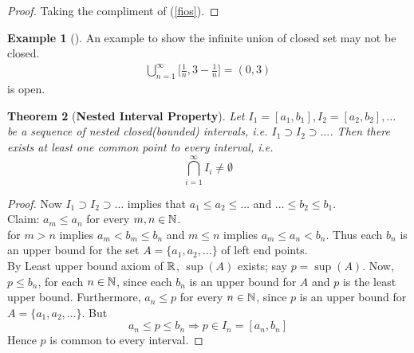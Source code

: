 \documentclass[	DIV=calc,paper=a4,fontsize=11pt]{scrartcl}	 	%
\newtheorem{thm}{Theorem}[section]
\theoremstyle{definition}
\newtheorem{exmp}[thm]{Example}
\theoremstyle{plain}
\theoremstyle{remark}
\begin{document}
\begin{proof}
Taking the compliment of (\ref{fios}).
\end{proof}

\begin{exmp}[]
An example to show the infinite union of closed set may not be closed.
\begin{align}
\bigcup_{n=1}^\infty \biggl[ \frac{1}{n},3-\frac{1}{n}\biggl]=(0,3)
\end{align}
is open.
\end{exmp}

\begin{thm}[\textbf{Nested Interval Property}]\label{nest}
Let $I_1=[a_1,b_1],I_2=[a_2,b_2],\ldots$ be a sequence of nested closed(bounded) intervals, i.e. $I_1\supset I_2\supset\ldots$. Then there exists at least one common point to every interval, i.e.
$$\bigcap_{i=1}^{\infty}I_i\neq \emptyset$$
\end{thm}
\begin{proof}
Now $I_1\supset I_2\supset\ldots$ implies that $a_1\leq a_2\leq \ldots$ and $\ldots \leq b_2\leq b_1$.\\
Claim: $a_m\leq a_n$ for every $m,n\in \Bbb N$.\\
for $m>n$ implies $a_m<b_m\leq b_n$ and $m\leq n$ implies $a_m\leq a_n<b_n$. Thus each $b_n$ is an upper bound for the set $A=\{a_1,a_2,\ldots\}$ of left end points.\\
By Least upper bound axiom of $\Bbb R$, $\sup (A)$ exists; say $p=\sup(A)$. Now, $p\leq b_n$, for each $n\in \Bbb N$, since each $b_n$ is an upper bound for $A$ and $p$ is the least upper bound. Furthermore, $a_n\leq p$ for every $n\in \Bbb N$, since $p$ is an upper bound for $A=\{a_1,a_2,\ldots\}.$ But
$$a_n\leq p\leq b_n\Rightarrow p\in I_n=[a_n,b_n]$$
Hence $p$ is common to every interval.
\end{proof}
\end{document}
